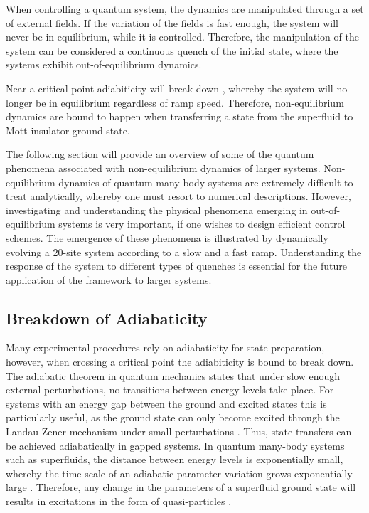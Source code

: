 When controlling a quantum system, the dynamics are manipulated through a set of external fields. If the variation of the fields is fast enough, the system will never be in equilibrium, while it is controlled. Therefore, the manipulation of the system can be considered a continuous quench of the initial state, where the systems exhibit out-of-equilibrium dynamics.

Near a critical point adiabiticity will break down \cite{Zurek2005}, whereby the system will no longer be in equilibrium regardless of ramp speed. Therefore, non-equilibrium dynamics are bound to happen when transferring a state from the superfluid to Mott-insulator ground state.

The following section will provide an overview of some of the quantum phenomena associated with non-equilibrium dynamics of larger systems. Non-equilibrium dynamics of quantum many-body systems are extremely difficult to treat analytically, whereby one must resort to numerical descriptions. However, investigating and understanding the physical phenomena emerging in out-of-equilibrium systems is very important, if one wishes to design efficient control schemes. The emergence of these phenomena is illustrated by dynamically evolving a 20-site system according to a slow and a fast ramp. Understanding the response of the system to different types of quenches is essential for the future application of the framework to larger systems.


\subsection{Breakdown of Adiabaticity}
Many experimental procedures rely on adiabaticity for state preparation, however, when crossing a critical point the adiabiticity is bound to break down.
The adiabatic theorem in quantum mechanics states that under slow enough external perturbations, no transitions between energy levels take place. For systems with an energy gap between the ground and excited states this is particularly useful, as the ground state can only become excited through the Landau-Zener mechanism under small perturbations \cite{Landau1932,Zener1932}. Thus, state transfers can be achieved adiabatically in gapped systems. In quantum many-body systems such as superfluids, the distance between energy levels is exponentially small, whereby the time-scale of an adiabatic parameter variation grows exponentially large \cite{Polkovnikov2008}. Therefore, any change in the parameters of a superfluid ground state will results in excitations in the form of quasi-particles \cite{Polkovnikov2008,Ozeri2005}.  

